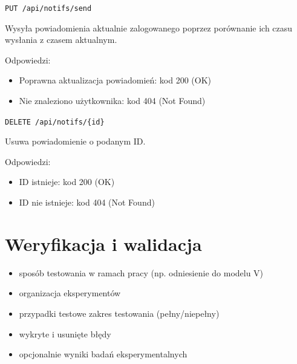 \documentclass[a4paper,twoside,12pt]{book}
\begin{document}
\label{send-current-users-notifications}

\texttt{PUT\ /api/notifs/send}

Wysyła powiadomienia aktualnie zalogowanego poprzez porównanie ich czasu wysłania z czasem aktualnym.

Odpowiedzi: 
\begin{itemize}
	\item Poprawna aktualizacja powiadomień: kod 200 (OK) 
	\item Nie znaleziono użytkownika: kod 404 (Not Found)
\end{itemize}

\label{delete-notification}

\texttt{DELETE\ /api/notifs/\{id\}}

Usuwa powiadomienie o podanym ID.

Odpowiedzi: 
\begin{itemize}
	\item ID istnieje: kod 200 (OK) 
	\item ID nie istnieje: kod 404 (Not Found)
\end{itemize}

%      




\chapter{Weryfikacja i walidacja}
\label{ch:06}
\begin{itemize}
\item sposób testowania w ramach pracy (np. odniesienie do modelu V)
\item organizacja eksperymentów
\item przypadki testowe zakres testowania (pełny/niepełny)
\item wykryte i usunięte błędy
\item opcjonalnie wyniki badań eksperymentalnych
\end{itemize}
\end{document}
